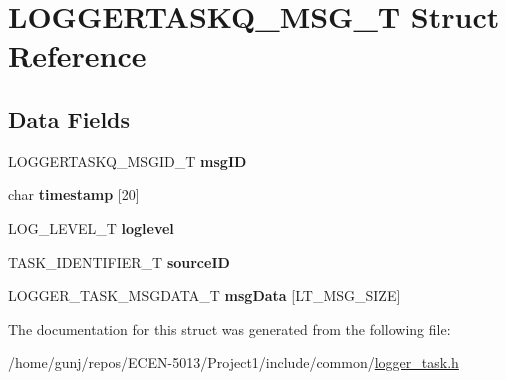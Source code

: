 \hypertarget{structLOGGERTASKQ__MSG__T}{}\section{L\+O\+G\+G\+E\+R\+T\+A\+S\+K\+Q\+\_\+\+M\+S\+G\+\_\+T Struct Reference}
\label{structLOGGERTASKQ__MSG__T}
\subsection*{Data Fields}
\begin{DoxyCompactItemize}
\item 
L\+O\+G\+G\+E\+R\+T\+A\+S\+K\+Q\+\_\+\+M\+S\+G\+I\+D\+\_\+T {\bfseries msg\+ID}\hypertarget{structLOGGERTASKQ__MSG__T_a6f3f926915ee4fed9eefaa2ae02565a0}{}\label{structLOGGERTASKQ__MSG__T_a6f3f926915ee4fed9eefaa2ae02565a0}

\item 
char {\bfseries timestamp} \mbox{[}20\mbox{]}\hypertarget{structLOGGERTASKQ__MSG__T_ad92d934c36ea8b693e20bd585b12dd36}{}\label{structLOGGERTASKQ__MSG__T_ad92d934c36ea8b693e20bd585b12dd36}

\item 
L\+O\+G\+\_\+\+L\+E\+V\+E\+L\+\_\+T {\bfseries loglevel}\hypertarget{structLOGGERTASKQ__MSG__T_abe7f4a15b1008087838d78abe25fd9d1}{}\label{structLOGGERTASKQ__MSG__T_abe7f4a15b1008087838d78abe25fd9d1}

\item 
T\+A\+S\+K\+\_\+\+I\+D\+E\+N\+T\+I\+F\+I\+E\+R\+\_\+T {\bfseries source\+ID}\hypertarget{structLOGGERTASKQ__MSG__T_a4bbfcb4a9e1a7846b56410dc69926b92}{}\label{structLOGGERTASKQ__MSG__T_a4bbfcb4a9e1a7846b56410dc69926b92}

\item 
L\+O\+G\+G\+E\+R\+\_\+\+T\+A\+S\+K\+\_\+\+M\+S\+G\+D\+A\+T\+A\+\_\+T {\bfseries msg\+Data} \mbox{[}L\+T\+\_\+\+M\+S\+G\+\_\+\+S\+I\+ZE\mbox{]}\hypertarget{structLOGGERTASKQ__MSG__T_a3105fa742571aeee5d90f15925eded89}{}\label{structLOGGERTASKQ__MSG__T_a3105fa742571aeee5d90f15925eded89}

\end{DoxyCompactItemize}


The documentation for this struct was generated from the following file\+:\begin{DoxyCompactItemize}
\item 
/home/gunj/repos/\+E\+C\+E\+N-\/5013/\+Project1/include/common/\hyperlink{logger__task_8h}{logger\+\_\+task.\+h}\end{DoxyCompactItemize}
